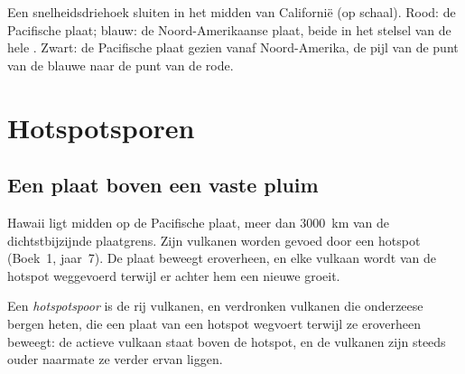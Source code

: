 \begin{omfigure}

{\small Een snelheidsdriehoek sluiten in het midden van Californië (op schaal). Rood:
de Pacifische plaat; blauw: de Noord-Amerikaanse plaat, beide in het stelsel van de
hele . Zwart: de Pacifische plaat gezien vanaf Noord-Amerika, de
pijl van de punt van de blauwe naar de punt van de rode.}
\end{omfigure}

\section{Hotspotsporen}

\subsection{Een plaat boven een vaste pluim}

Hawaii ligt midden op de Pacifische plaat, meer dan \qty{3000}{km}
van de dichtstbijzijnde plaatgrens.
 Zijn vulkanen worden gevoed door een hotspot (Boek~1,
jaar~7). De plaat beweegt eroverheen, en elke vulkaan wordt van de
hotspot weggevoerd terwijl er achter hem een nieuwe groeit.

\begin{definition}[Hotspotspoor]\label{def:g11:plate-motions:hotspot-track}
Een \emph{hotspotspoor} is de rij vulkanen, en
verdronken vulkanen die onderzeese bergen heten, die een plaat van een
hotspot wegvoert terwijl ze eroverheen beweegt: de actieve vulkaan staat boven de
hotspot, en de vulkanen zijn steeds ouder naarmate ze verder ervan liggen.
\end{definition}

